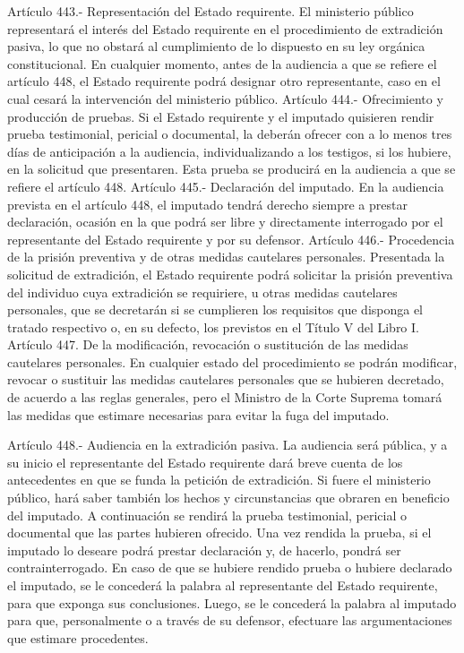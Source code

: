     Artículo 443.- Representación del Estado requirente. El ministerio público representará el interés del Estado requirente en el procedimiento de extradición pasiva, lo que no obstará al cumplimiento de lo dispuesto en su ley orgánica constitucional.
    En cualquier momento, antes de la audiencia a que se refiere el artículo 448, el Estado requirente podrá designar otro representante, caso en el cual cesará la intervención del ministerio público.
    Artículo 444.- Ofrecimiento y producción de pruebas. Si el Estado requirente y el imputado quisieren rendir prueba testimonial, pericial o documental, la deberán ofrecer con a lo menos tres días de anticipación a la audiencia, individualizando a los testigos, si los hubiere, en la solicitud que presentaren. Esta prueba se producirá en la audiencia a que se refiere el artículo 448.
    Artículo 445.- Declaración del imputado. En la audiencia prevista en el artículo 448, el imputado tendrá derecho siempre a prestar declaración, ocasión en la que podrá ser libre y directamente interrogado por el representante del Estado requirente y por su defensor.
    Artículo 446.- Procedencia de la prisión preventiva y de otras medidas cautelares personales. Presentada la solicitud de extradición, el Estado requirente podrá solicitar la prisión preventiva del individuo cuya extradición se requiriere, u otras medidas cautelares personales, que se decretarán si se cumplieren los requisitos que disponga el tratado respectivo o, en su defecto, los previstos en el Título V del Libro I.
    Artículo 447. De la modificación, revocación o sustitución de las medidas cautelares personales. En cualquier estado del procedimiento se podrán modificar, revocar o sustituir las medidas cautelares personales que se hubieren decretado, de acuerdo a las reglas generales, pero el Ministro de la Corte Suprema tomará las medidas que estimare necesarias para evitar la fuga del imputado.

    Artículo 448.- Audiencia en la extradición pasiva. La audiencia será pública, y a su inicio el representante del Estado requirente dará breve cuenta de los antecedentes en que se funda la petición de extradición. Si fuere el ministerio público, hará saber también los hechos y circunstancias que obraren en beneficio del imputado.
    A continuación se rendirá la prueba testimonial, pericial o documental que las partes hubieren ofrecido.
    Una vez rendida la prueba, si el imputado lo deseare podrá prestar declaración y, de hacerlo, pondrá ser contrainterrogado.
    En caso de que se hubiere rendido prueba o hubiere declarado el imputado, se le concederá la palabra al representante del Estado requirente, para que exponga sus conclusiones.
    Luego, se le concederá la palabra al imputado para que, personalmente o a través de su defensor, efectuare las argumentaciones que estimare procedentes.

